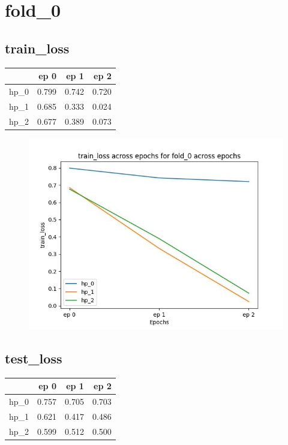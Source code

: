 \documentclass{article}
\begin{document}
\section{fold\_0}
\subsection{train\_loss}
\begin{tabular}{lrrr}
\toprule
{} &   ep 0 &   ep 1 &   ep 2 \\
\midrule
hp\_0 &  0.799 &  0.742 &  0.720 \\
hp\_1 &  0.685 &  0.333 &  0.024 \\
hp\_2 &  0.677 &  0.389 &  0.073 \\
\bottomrule
\end{tabular}

\begin{figure}[H]
\includegraphics[scale = 0.75]{fold_0/train_loss}
\end{figure}
\subsection{test\_loss}
\begin{tabular}{lrrr}
\toprule
{} &   ep 0 &   ep 1 &   ep 2 \\
\midrule
hp\_0 &  0.757 &  0.705 &  0.703 \\
hp\_1 &  0.621 &  0.417 &  0.486 \\
hp\_2 &  0.599 &  0.512 &  0.500 \\
\bottomrule
\end{tabular}
\end{document}
